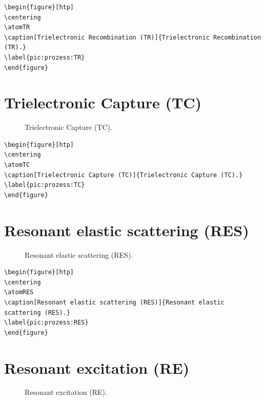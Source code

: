 \documentclass[
	a4paper,
	parskip=half,
    pagesize=auto,      		%
    listof=totoc,   		%
    bibliography=totoc,
	11pt
]{scrartcl}
\begin{document}
\begin{lstlisting}
\begin{figure}[htp]
\centering
\atomTR
\caption[Trielectronic Recombination (TR)]{Trielectronic Recombination (TR).}
\label{pic:prozess:TR}
\end{figure}
\end{lstlisting}


\section{Trielectronic Capture (TC)}

\begin{figure}[htp]
\centering
\atomTC
\caption[Trielectronic Capture (TC)]{Trielectronic Capture (TC).}
\label{pic:prozess:TRS}
\end{figure}

\begin{lstlisting}
\begin{figure}[htp]
\centering
\atomTC
\caption[Trielectronic Capture (TC)]{Trielectronic Capture (TC).}
\label{pic:prozess:TC}
\end{figure}
\end{lstlisting}


\section{Resonant elastic scattering (RES)}

\begin{figure}[htp]
\centering
\atomRES
\caption[Resonant elastic scattering (RES)]{Resonant elastic scattering (RES).}
\label{pic:prozess:RES}
\end{figure}

\begin{lstlisting}
\begin{figure}[htp]
\centering
\atomRES
\caption[Resonant elastic scattering (RES)]{Resonant elastic scattering (RES).}
\label{pic:prozess:RES}
\end{figure}
\end{lstlisting}

\section{Resonant excitation (RE)}

\begin{figure}[htp]
\centering
\atomRE
\caption[Resonant excitation (RE)]{Resonant excitation (RE).}
\label{pic:prozess:RE}
\end{figure}
\end{document}
